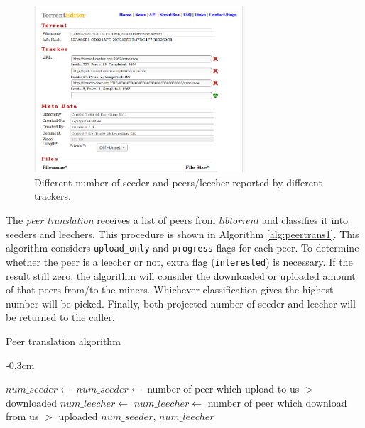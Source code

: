\begin{figure}[ht]
	\centering
	\includegraphics[width=0.7\textwidth]{pics/diffsr.png}
	\caption{Different number of seeder and peers/leecher reported by different trackers.}
	\label{fig:diffsr}
\end{figure}

The \textit{peer translation} receives a list of peers from \textit{libtorrent} and classifies it into seeders and leechers. This procedure is shown in Algorithm \ref{alg:peertrans1}. This algorithm considers \texttt{upload\_only} and \texttt{progress} flags for each peer. To determine whether the peer is a leecher or not, extra flag (\texttt{interested}) is necessary. If the result still zero, the algorithm will consider the downloaded or uploaded amount of that peers  from/to the miners. Whichever classification gives the highest number will be picked. Finally, both projected number of seeder and leecher will be returned to the caller.

\begin{algorithm}[t]
	\caption{Peer translation algorithm}
	\label{alg:peertrans1}
	\begin{adjustwidth}{}{-0.3cm}
	\begin{algorithmic}[1]
		\Statex
		\State $num\_seeder \gets $ 
		\State $num\_seeder \gets $ number of peer which upload to us $>$ downloaded
		\EndIf
		\State $num\_leecher \gets $  \label{alg:peertrans1:pickleech}
		\State $num\_leecher \gets $ number of peer which download from us $>$ uploaded
		\EndIf
		\State \Return $num\_seeder$, $num\_leecher$
		\EndFunction
	\end{algorithmic}
	\end{adjustwidth}
\end{algorithm}

